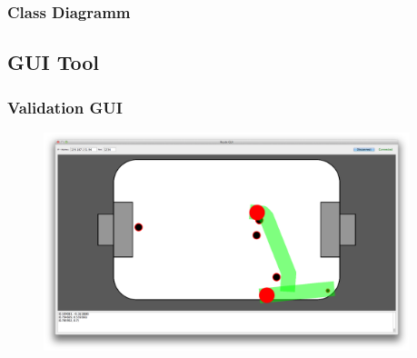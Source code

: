 \documentclass[hyperref={pdfpagelabels=false},compress]{beamer}
\begin{document}
\begin{frame}
    \frametitle{Class Diagramm}
    \begin{center}
        
    \end{center}
\end{frame}

\subsection{GUI Tool}
\begin{frame}
    \frametitle{Validation GUI}
    \begin{figure}
        \center
        \includegraphics[width=0.95\textwidth]{Pictures/gui-big}
    \end{figure}

\end{frame}
\end{document}
